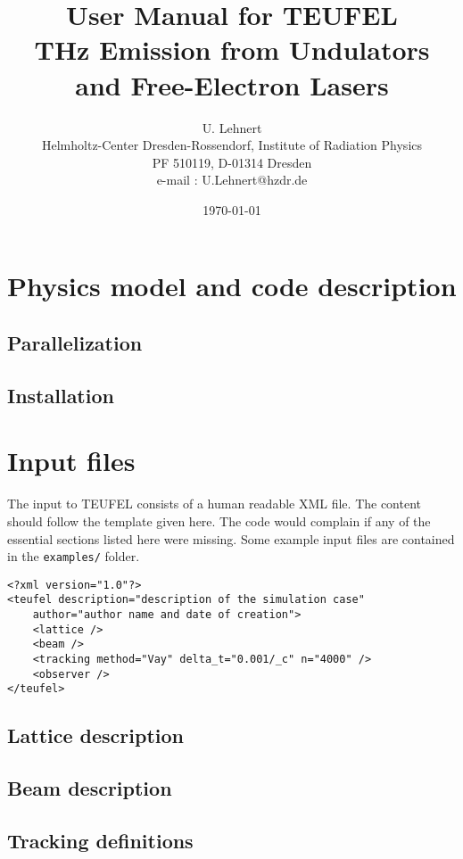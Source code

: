 \documentclass[11pt]{article}
\title{User Manual for TEUFEL \\ THz Emission from Undulators and Free-Electron Lasers}
\author{U. Lehnert\\
\footnotesize{Helmholtz-Center Dresden-Rossendorf, Institute of Radiation Physics}\\
\footnotesize{PF 510119, D-01314 Dresden}\\
\footnotesize{e-mail : U.Lehnert@hzdr.de}}
\date{\today\\[1cm]}
\begin{document}
\maketitle
\tableofcontents

\section{Physics model and code description}

\subsection{Parallelization}

\subsection{Installation}

\section{Input files}

The input to TEUFEL consists of a human readable XML file. The content should follow
the template given here. The code would complain if any of the essential sections
listed here were missing. Some example input files are contained in the \verb|examples/| folder.

\begin{lstlisting}
<?xml version="1.0"?>
<teufel description="description of the simulation case"
    author="author name and date of creation">
    <lattice />
    <beam />
    <tracking method="Vay" delta_t="0.001/_c" n="4000" />
    <observer />
</teufel>
\end{lstlisting}

\subsection{Lattice description}


\subsection{Beam description}


\subsection{Tracking definitions}
\end{document}
